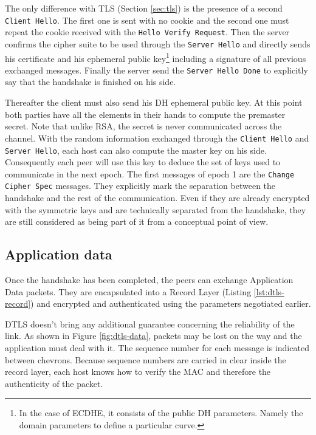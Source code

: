 The only difference with TLS (Section \ref{sec:tls}) is the presence of a second \texttt{Client Hello}. The first one is sent with no cookie and the second one must repeat the cookie received with the \texttt{Hello Verify Request}. Then the server confirms the cipher suite to be used through the \texttt{Server Hello} and directly sends his certificate and his ephemeral public key\footnote{In the case of ECDHE, it consists of the public DH parameters. Namely the domain parameters to define a particular curve.} including a signature of all previous exchanged messages. Finally the server send the \texttt{Server Hello Done} to explicitly say that the handshake is finished on his side.

Thereafter the client must also send his DH ephemeral public key. At this point both parties have all the elements in their hands to compute the premaster secret. Note that unlike RSA, the secret is never communicated across the channel. With the random information exchanged through the \texttt{Client Hello} and \texttt{Server Hello}, each host can also compute the master key on his side. Consequently each peer will use this key to deduce the set of keys used to communicate in the next epoch. The first messages of epoch 1 are the \texttt{Change Cipher Spec} messages. They explicitly mark the separation between the handshake and the rest of the communication. Even if they are already encrypted with the symmetric keys and are technically separated from the handshake, they are still considered as being part of it from a conceptual point of view.


\subsection{Application data}

Once the handshake has been completed, the peers can exchange Application Data packets. They are encapsulated into a Record Layer (Listing \ref{lst:dtls-record}) and encrypted and authenticated using the parameters negotiated earlier. 

DTLS doesn't bring any additional guarantee concerning the reliability of the link. As shown in Figure \ref{fig:dtls-data}, packets may be lost on the way and the application must deal with it. The sequence number for each message is indicated between chevrons. Because sequence numbers are carried in clear inside the record layer, each host knows how to verify the MAC and therefore the authenticity of the packet.

